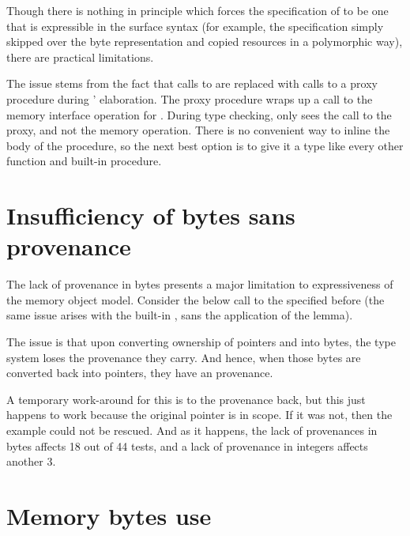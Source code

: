Though there is nothing in principle which forces the specification of
 to be one that is expressible in the surface syntax (for
example, the specification simply skipped over the byte representation and
copied resources in a polymorphic way), there are practical limitations.

The issue stems from the fact that calls to  are
replaced with calls to a proxy  procedure during '
elaboration. The proxy procedure wraps up a call to the memory interface
operation for . During type checking,  only
sees the call to the proxy, and not the memory operation. There is no
convenient way to inline the body of the procedure, so the next best
option is to give it a type like every other function and built-in
procedure.

\section{Insufficiency of bytes sans provenance}\label{sec:insufficiency}

The lack of provenance in bytes presents a major limitation to expressiveness
of the memory object model. Consider the below call to the
 specified before (the same issue arises with the built-in
, sans the application of the 
lemma).


The issue is that upon converting ownership of pointers  and
 into bytes, the type system loses the provenance they carry. And
hence, when those bytes are converted back into pointers, they have an
 provenance.

A temporary work-around for this is to  the
provenance back, but this just happens to work because the original pointer is
in scope. If it was not, then the example could not be rescued. And as it
happens, the lack of provenances in bytes affects 18 out of 44 tests, and a
lack of provenance in integers affects another 3.


\section{Memory bytes use}\label{sec:mem-bytes-use}

